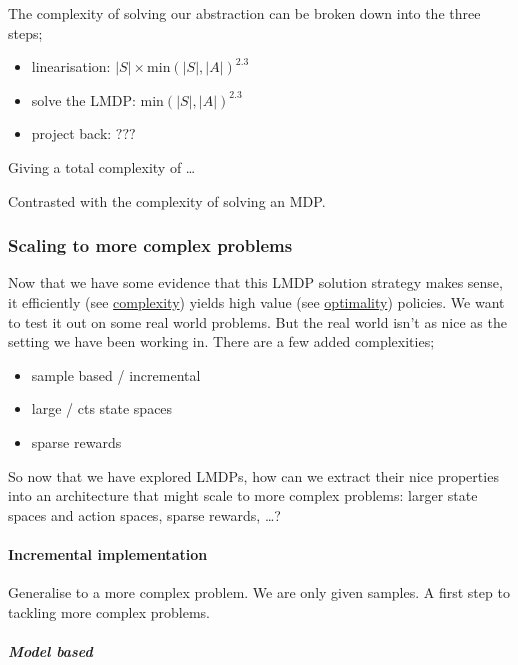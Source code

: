 The complexity of solving our abstraction can be broken down into the
three steps;

\begin{itemize}
\tightlist
\item
  linearisation: \(|S| \times \text{min}(|S|,|A|)^{2.3}\)
\item
  solve the LMDP: \(\text{min}(|S|,|A|)^{2.3}\)
\item
  project back: \(???\)
\end{itemize}

Giving a total complexity of \ldots{}

Contrasted with the complexity of solving an MDP.

\hypertarget{scaling-to-more-complex-problems}{%
\subsubsection{Scaling to more complex
problems}\label{scaling-to-more-complex-problems}}

Now that we have some evidence that this LMDP solution strategy makes
sense, it efficiently (see \href{}{complexity}) yields high value (see
\href{}{optimality}) policies. We want to test it out on some real world
problems. But the real world isn't as nice as the setting we have been
working in. There are a few added complexities;

\begin{itemize}
\tightlist
\item
  sample based / incremental
\item
  large / cts state spaces
\item
  sparse rewards
\end{itemize}

So now that we have explored LMDPs, how can we extract their nice
properties into an architecture that might scale to more complex
problems: larger state spaces and action spaces, sparse rewards,
\ldots{}?

\hypertarget{incremental-implementation}{%
\paragraph{Incremental
implementation}\label{incremental-implementation}}

Generalise to a more complex problem. We are only given samples. A first
step to tackling more complex problems.

\hypertarget{model-based}{%
\subparagraph{Model based}\label{model-based}}

